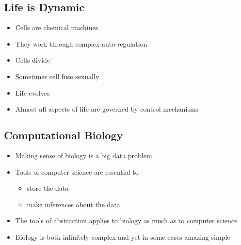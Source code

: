 
\begin{slide}
\section{Life is Dynamic}

\begin{PauseHighLight}
  \begin{itemize}
  \item Cells are chemical machines\pause
  \item They work through complex auto-regulation\pause
  \item Cells divide\pause
  \item Sometimes cell fuse sexually\pause
  \item Life evolves\pause
  \item Almost all aspects of life are governed by control mechanisms\pauseb
  \end{itemize}
\end{PauseHighLight}

\end{slide}


\begin{slide}
\section{Computational Biology}

\begin{PauseHighLight}
  \begin{itemize}
  \item Making sense of biology is a big data problem\pause
  \item Tools of computer science are essential to
    \begin{itemize}
    \item store the data
    \item make inferences about the data\pause
    \end{itemize}
  \item The tools of abstraction applies to biology as much as to
    computer science\pause
  \item Biology is both infinitely complex\pause{} and yet in some
    cases amazing simple\pauseb
  \end{itemize}
\end{PauseHighLight}


\end{slide}

